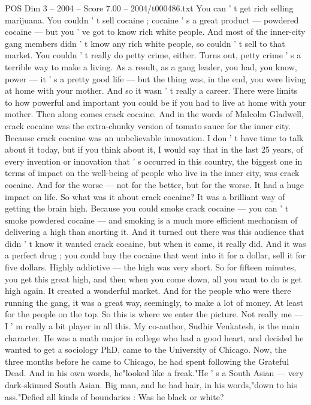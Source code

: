 \begin{textsample}{POS Dim 3 – 2004 – Score 7.00 – 2004/t000486.txt}
You can ' t get rich selling marijuana.
You couldn ' t sell cocaine ; cocaine ' s a great product — powdered cocaine — but you ' ve got to know rich white people.
And most of the inner-city gang members didn ' t know any rich white people, so couldn ' t sell to that market.
You couldn ' t really do petty crime, either.
Turns out, petty crime ' s a terrible way to make a living.
As a result, as a gang leader, you had, you know, power — it ' s a pretty good life — but the thing was, in the end, you were living at home with your mother.
And so it wasn ' t really a career.
There were limits to how powerful and important you could be if you had to live at home with your mother.
Then along comes crack cocaine.
And in the words of Malcolm Gladwell, crack cocaine was the extra-chunky version of tomato sauce for the inner city.
Because crack cocaine was an unbelievable innovation.
I don ' t have time to talk about it today, but if you think about it, I would say that in the last 25 years, of every invention or innovation that ' s occurred in this country, the biggest one in terms of impact on the well-being of people who live in the inner city, was crack cocaine.
And for the worse — not for the better, but for the worse.
It had a huge impact on life.
So what was it about crack cocaine?
It was a brilliant way of getting the brain high.
Because you could smoke crack cocaine — you can ' t smoke powdered cocaine — and smoking is a much more efficient mechanism of delivering a high than snorting it.
And it turned out there was this audience that didn ' t know it wanted crack cocaine, but when it came, it really did.
And it was a perfect drug ; you could buy the cocaine that went into it for a dollar, sell it for five dollars.
Highly addictive — the high was very short.
So for fifteen minutes, you get this great high, and then when you come down, all you want to do is get high again.
It created a wonderful market.
And for the people who were there running the gang, it was a great way, seemingly, to make a lot of money.
At least for the people on the top.
So this is where we enter the picture.
Not really me — I ' m really a bit player in all this.
My co-author, Sudhir Venkatesh, is the main character.
He was a math major in college who had a good heart, and decided he wanted to get a sociology PhD, came to the University of Chicago.
Now, the three months before he came to Chicago, he had spent following the Grateful Dead.
And in his own words, he"looked like a freak."He ' s a South Asian — very dark-skinned South Asian.
Big man, and he had hair, in his words,"down to his ass."Defied all kinds of boundaries : Was he black or white?

\end{textsample}
